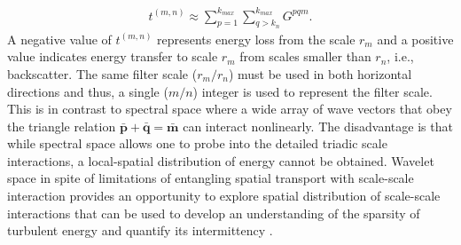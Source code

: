 \begin{align}
t^{(m,n)} \approx \sum_{p=1}^{k_{max}} \sum_{q>k_n}^{k_{max}} G^{pqm}.
\end{align}
A negative value of $t^{(m,n)}$ represents energy loss from the scale $r_m$ and a positive value indicates energy transfer to scale $r_m$ from scales smaller than $r_n$, i.e., backscatter. The same filter scale ($r_m/r_n$) must be used in both horizontal directions and thus, a single ($m/n$) integer is used to represent the filter scale. This is in contrast to spectral space where a wide array of wave vectors that obey the triangle relation $\bar{\mathbf{p}}+\bar{\mathbf{q}}=\bar{\mathbf{m}}$ can interact nonlinearly. The disadvantage is that while spectral space allows one to probe into the detailed triadic scale interactions, a local-spatial distribution of energy cannot be obtained. Wavelet space in spite of limitations of entangling spatial transport with scale-scale interaction provides an opportunity to explore spatial distribution of scale-scale interactions that can be used to develop an understanding of the sparsity of turbulent energy and quantify its intermittency \citep{dunn_jfm_2003, dunn_cf2005,meneveau_91jfm}. 

